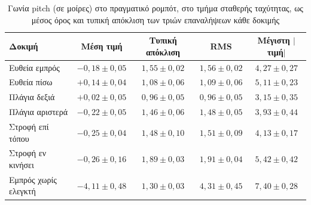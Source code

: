 \documentclass[11pt]{report}
\begin{document}
\begin{table}[htbp]
    \centering
    \small
    \begin{tabular}{@{}l c c c c@{}}
        \toprule
        Δοκιμή & Μέση τιμή & Τυπική απόκλιση & RMS & Μέγιστη $|$τιμή$|$ \\
        \midrule
        Ευθεία εμπρός & $-0{,}18 \pm 0{,}05$ & $1{,}55 \pm 0{,}02$ & $1{,}56 \pm 0{,}02$ & $4{,}27 \pm 0{,}27$ \\
        Ευθεία πίσω & $+0{,}14 \pm 0{,}04$ & $1{,}08 \pm 0{,}06$ & $1{,}09 \pm 0{,}06$ & $5{,}11 \pm 0{,}23$ \\
        Πλάγια δεξιά & $+0{,}02 \pm 0{,}05$ & $0{,}96 \pm 0{,}05$ & $0{,}96 \pm 0{,}05$ & $3{,}15 \pm 0{,}35$ \\
        Πλάγια αριστερά & $-0{,}22 \pm 0{,}05$ & $1{,}46 \pm 0{,}06$ & $1{,}48 \pm 0{,}05$ & $3{,}93 \pm 0{,}44$ \\
        Στροφή επί τόπου & $-0{,}25 \pm 0{,}04$ & $1{,}48 \pm 0{,}10$ & $1{,}51 \pm 0{,}09$ & $4{,}13 \pm 0{,}17$ \\
        Στροφή εν κινήσει & $-0{,}26 \pm 0{,}16$ & $1{,}89 \pm 0{,}03$ & $1{,}91 \pm 0{,}04$ & $5{,}42 \pm 0{,}42$ \\
        Εμπρός χωρίς ελεγκτή & $-4{,}11 \pm 0{,}48$ & $1{,}30 \pm 0{,}03$ & $4{,}31 \pm 0{,}45$ & $7{,}40 \pm 0{,}28$ \\
        \bottomrule
    \end{tabular}
    \caption[Γωνία pitch στο πραγματικό ρομπότ]{Γωνία pitch (σε μοίρες) στο
    πραγματικό ρομπότ, στο τμήμα σταθερής ταχύτητας, ως μέσος όρος και τυπική
    απόκλιση των τριών επαναλήψεων κάθε δοκιμής}
    \label{tab:final-pitch}
\end{table}
\end{document}
